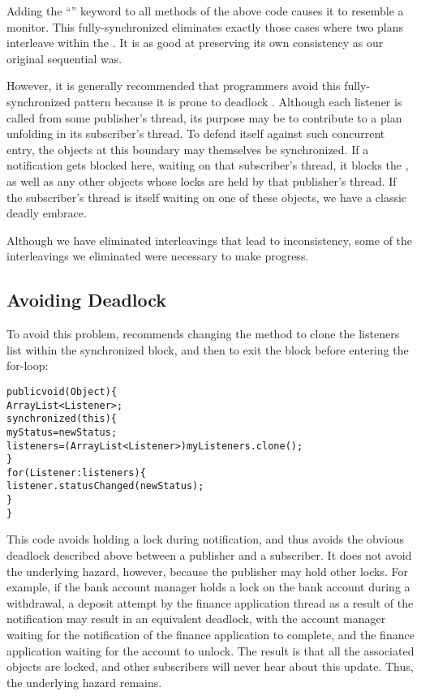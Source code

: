 \documentclass{llncs}
\begin{document}
Adding the ``'' keyword to all methods of the above
code causes it to resemble a monitor. This fully-synchronized
 eliminates exactly those cases where two plans
interleave within the . It is as good at preserving
its own consistency as our original sequential 
was.

However, it is generally recommended that  programmers avoid
this fully-synchronized pattern because it is prone to deadlock
\cite{Englander:beans}. Although each listener is called from some
publisher's thread, its purpose may be to contribute to a plan
unfolding in its subscriber's thread. To defend itself against such
concurrent entry, the objects at this boundary may themselves be
synchronized. If a  notification gets blocked
here, waiting on that subscriber's thread, it blocks the
, as well as any other objects whose locks are held
by that publisher's thread. If the subscriber's thread is itself
waiting on one of these objects, we have a classic deadly embrace.

Although we have eliminated interleavings that lead to inconsistency,
some of the interleavings we eliminated were necessary to make
progress.

\subsection{Avoiding Deadlock}

To avoid this problem, \cite{Englander:beans} recommends changing the
 method to clone the listeners list within the
synchronized block, and then to exit the block before entering the
for-loop:
%
\begin{alltt}
    public void (Object ) \{
        ArrayList<Listener> ;
        synchronized (this) \{
            myStatus = newStatus;
            listeners = (ArrayList<Listener>) myListeners.clone();
        \}
        for (Listener : listeners) \{
            listener.statusChanged(newStatus);
        \}
    \}
\end{alltt}
%
This code avoids holding a lock during notification, and thus avoids
the obvious deadlock described above between a publisher and a
subscriber.  It does not avoid the underlying hazard, however, because
the publisher may hold other locks.  For example, if the bank account
manager holds a lock on the bank account during a withdrawal, a
deposit attempt by the finance application thread as a result of the
notification may result in an equivalent deadlock, with the account
manager waiting for the notification of the finance application to
complete, and the finance application waiting for the account to
unlock.  The result is that all the associated objects are locked, and
other subscribers will never hear about this update.  Thus, the
underlying hazard remains.
\end{document}
